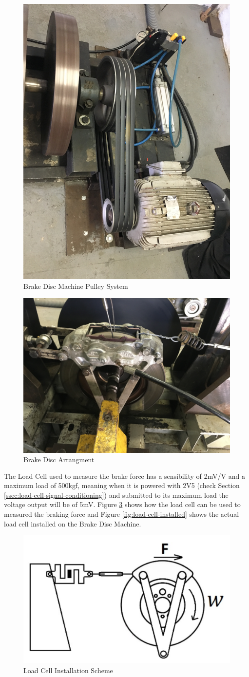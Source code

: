 		\begin{figure}[htbp]
			\centering
			\includegraphics[width=.5\textwidth]{figuras/fig-brake-disc-machine-pulley}
			\caption{Brake Disc Machine Pulley System}
			\label{fig:brake-disc-machine-pulley}
		\end{figure}

		\begin{figure}[htbp]
			\centering
			\includegraphics[width=.5\textwidth]{figuras/fig-brake-disc}
			\caption{Brake Disc Arrangment}
			\label{fig:brake-disc}
		\end{figure}
		\par

		The Load Cell used to measure the brake force has a sensibility of 2mV/V and a maximum load of 500kgf, meaning when it is powered with 2V5 (check Section \ref{ssec:load-cell-signal-conditioning}) and submitted to its maximum load the voltage output will be of 5mV. Figure \ref{fig:load-cell-installation-scheme} shows how the load cell can be used to measured the braking force and Figure \ref{fig:load-cell-installed} shows the actual load cell installed on the Brake Disc Machine.

		\begin{figure}[htbp]
			\centering
			\includegraphics[width=.5\textwidth]{figuras/fig-load-cell-installation-scheme}
			\caption{Load Cell Installation Scheme \cite{caixeta2017}}
			\label{fig:load-cell-installation-scheme}
		\end{figure}

